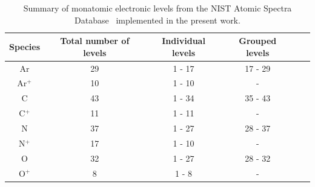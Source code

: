 \begin{table}[h]
 \center
 \caption{Summary of monatomic electronic levels from the NIST Atomic Spectra Database~\cite{NIST_ASD} implemented in the present work.}
 \label{tab:atomic-levels-and-lines}
 \begin{tabular*}{0.8\textwidth}{cccccc}
  \hline Species                          & Total number of levels  & Individual levels  & Grouped levels        \\
  \hline  
                  Ar                               & 29                                      &   1 - 17                   & 17 - 29 \\ 
                  Ar$^+$                      & 10                                        & 1 - 10                        & - \\ 
                  C                                & 43                                      &  1 - 34                    & 35 - 43 \\
                  C$^+$                       & 11                                      &  1 - 11                    & - \\
                  N                                &  37                                     & 1 - 27                     & 28 - 37 \\
                  N$^+$                       &  17                                     & 1 - 10                     & - \\
                  O                               &   32                                     & 1 - 27                     & 28 - 32 \\
                  O$^+$                      &  8                                        & 1 - 8                        & - \\ 
  \hline
 \end{tabular*}
\end{table}

